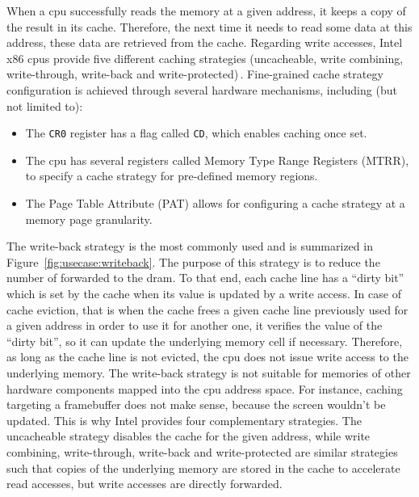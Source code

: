 When a \ac{cpu} successfully reads the memory at a given address, it keeps a
copy of the result in its cache.
%
Therefore, the next time it needs to read some data at this address, these data
are retrieved from the cache.
%
Regarding write accesses, Intel x86 \acp{cpu} provide five different caching
strategies (uncacheable, write combining, write-through, write-back and
write-protected)\,\cite[Volume 3, Chapter~11]{intel2014manual}.
%
Fine-grained cache strategy configuration is achieved through several hardware
mechanisms, including (but not limited to):
%
\begin{itemize}
\item The \texttt{CR0} register has a flag called \texttt{CD}, which enables
  caching once set.
%
\item The \ac{cpu} has several registers called Memory Type Range Registers
  (MTRR), to specify a cache strategy for pre-defined memory regions.
%
\item The Page Table Attribute (PAT) allows for configuring a cache strategy at
  a memory page granularity.
\end{itemize}
%
The write-back strategy is the most commonly used and is summarized in
Figure~\ref{fig:usecase:writeback}.
%
The purpose of this strategy is to reduce the number of \IO forwarded to the
\ac{dram}.
%
To that end, each cache line has a ``dirty bit'' which is set by the cache when
its value is updated by a write access.
%
In case of cache eviction, that is when the cache frees a given cache line
previously used for a given address in order to use it for another one, it
verifies the value of the ``dirty bit'', so it can update the underlying memory
cell if necessary.
%
Therefore, as long as the cache line is not evicted, the \ac{cpu} does not issue
write access to the underlying memory.
%
The write-back strategy is not suitable for memories of other hardware
components mapped into the \ac{cpu} address space.
%
For instance, caching \IOs targeting a framebuffer does not make sense, because
the screen wouldn't be updated.
%
This is why Intel provides four complementary strategies.
%
The uncacheable strategy disables the cache for the given address, while write
combining, write-through, write-back and write-protected are similar strategies
such that copies of the underlying memory are stored in the cache to accelerate
read accesses, but write accesses are directly forwarded.


